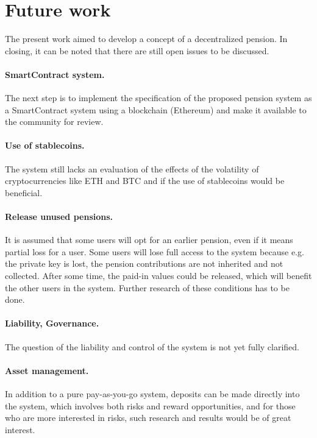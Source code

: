 \section{Future work}
The present work aimed to develop a concept of a decentralized pension. In closing, it can be noted that there are still open issues to be discussed.

\paragraph{SmartContract system.} The next step is to implement the specification of the proposed pension system as a SmartContract system using a blockchain (Ethereum) and make it available to the community for review.

\paragraph{Use of stablecoins.} The system still lacks an evaluation of the effects of the volatility of cryptocurrencies like ETH and BTC and if the use of stablecoins would be beneficial. 

\paragraph{Release unused pensions.} It is assumed that some users will opt for an earlier pension, even if it means partial loss for a user. Some users will lose full access to the system because e.g. the private key is lost, the pension contributions are not inherited and not collected. After some time, the paid-in values could be released, which will benefit the other users in the system. Further research of these conditions has to be done.

\paragraph{Liability, Governance.} The question of the liability and control of the system is not yet fully clarified.

\paragraph{Asset management.} In addition to a pure pay-as-you-go system, deposits can be made directly into the system, which involves both risks and reward opportunities, and for those who are more interested in risks, such research and results would be of great interest.


